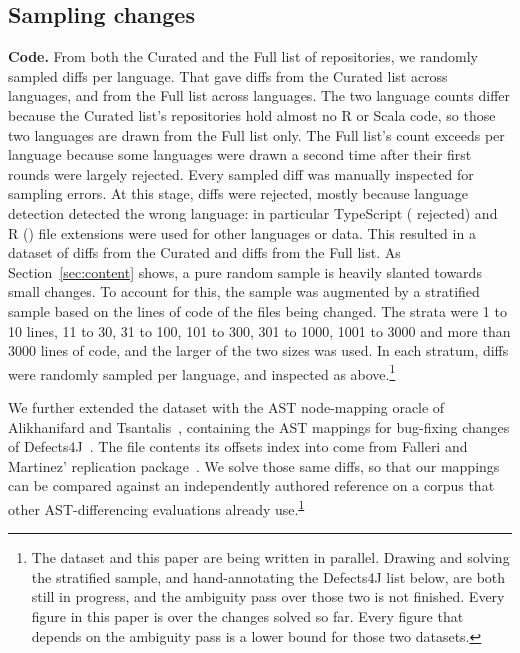 \documentclass[sigconf,review]{acmart}
\begin{document}
\subsection{Sampling changes}
\label{sec:diff-shape}

\textbf{Code.} From both the Curated and the Full list of repositories, we randomly sampled
\SampleDiffsPerLanguage{} diffs per language. That gave \SampleCuratedSampled{} diffs from the
Curated list across \SampleCuratedLanguages{} languages, and \SampleFullSampled{} from the Full
list across \SampleFullLanguages{} languages. The two language counts differ because the Curated
list's repositories hold almost no R or Scala code, so those two languages are drawn from the Full
list only. The Full list's count exceeds \SampleDiffsPerLanguage{} per language because some
languages were drawn a second time after their first rounds were largely rejected. Every sampled
diff was manually inspected for sampling errors. At this stage, \SampleRejectedTotal{} diffs were
rejected, mostly because language detection detected the wrong language: in particular TypeScript
(\SampleRejectedTypeScript{} rejected) and R (\SampleRejectedR{}) file extensions were used for
other languages or data. This resulted in a dataset of \SampleCuratedPromoted{} diffs from the
Curated and \SampleFullPromoted{} diffs from the Full list. As Section~\ref{sec:content} shows, a
pure random sample is heavily slanted towards small changes. To account for this, the sample was
augmented by a stratified sample based on the lines of code of the files being changed. The
strata were 1 to 10 lines, 11 to 30, 31 to 100, 101 to 300, 301 to 1000, 1001 to 3000 and more
than 3000 lines of code, and the larger of the two sizes was used. In each stratum,
\SampleStratifiedPerCell{} diffs were randomly sampled per language, and inspected as
above.\footnote{\label{fn:in-progress}The dataset and this paper are being written in parallel.
Drawing and solving the stratified sample, and hand-annotating the Defects4J list below, are both
still in progress, and the ambiguity pass over those two is not finished. Every figure in this
paper is over the \NumFixtures{} changes solved so far. Every figure that depends on the ambiguity
pass is a lower bound for those two datasets.}

We further extended the dataset with the AST node-mapping oracle of Alikhanifard and
Tsantalis~\cite{astdiffbenchmark}, containing the \OracleUnits{} AST mappings for \OracleCases{}
bug-fixing changes of Defects4J~\cite{defects4j}. The file contents its offsets index into come
from Falleri and Martinez' replication package~\cite{gumtreesimple}. We solve those same
\OracleUnits{} diffs, so that our mappings can be compared against an independently authored
reference on a corpus that other AST-differencing evaluations already
use.\textsuperscript{\ref{fn:in-progress}}
\end{document}
